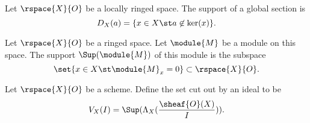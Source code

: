 \begin{definition}[Support]
Let $\rspace{X}{O}$ be a locally ringed space.
The support of a global section is
\[D_X(a) = \{x\in X \st a\not\in \ker(x)\}.\]
\end{definition}

\begin{definition}
Let $\rspace{X}{O}$ be a ringed space.
Let $\module{M}$ be a module on this space.
The support $\Sup(\module{M})$ of this module is the subspace
\[\set{x \in X \st \module{M}_x = 0} \subset \rspace{X}{O}.\]
\end{definition}

\begin{definition}
Let $\rspace{X}{O}$ be a scheme.
Define the set cut out by an ideal to be
\[V_X(I) = \Sup(\Lambda_X(\frac{\sheaf{O}(X)}{I})).\]
\end{definition}